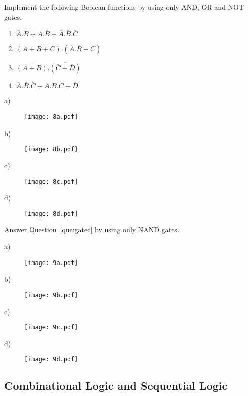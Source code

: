 \begin{ExerciseList}
\Exercise
\label{que:gatec}
Implement the following Boolean functions by using only AND, OR and NOT gates.
\begin{enumerate}[ a) ]
\item
$\overline A .B + A.\overline B + \overline A.\overline B.\overline C$
\item
$\overline{(A+B+C)}.(\overline A.\overline B+C)$
\item
$\overline{(A+B)}.\overline{(\overline C+\overline D)}$
\item
$\overline A.\overline B.\overline C + A.B.C + \overline D$
\end{enumerate}
a)
\begin{figure} [H]
  \texttt{[image: 8a.pdf]}
\end{figure}
b)\begin{figure} [H]
  \texttt{[image: 8b.pdf]}
\end{figure}
c)\begin{figure} [H]
  \texttt{[image: 8c.pdf]}
\end{figure}
d)\begin{figure} [H]
  \texttt{[image: 8d.pdf]}
\end{figure}

\Exercise
Answer Question~\ref{que:gatec} by using only NAND gates.

\Answer
a)
\begin{figure} [H]
  \texttt{[image: 9a.pdf]}
\end{figure}
b)\begin{figure} [H]
  \texttt{[image: 9b.pdf]}
\end{figure}
c)\begin{figure} [H]
  \texttt{[image: 9c.pdf]}
\end{figure}
d)\begin{figure} [H]
  \texttt{[image: 9d.pdf]}
\end{figure}

\end{ExerciseList}

\subsection*{Combinational Logic and Sequential Logic}

